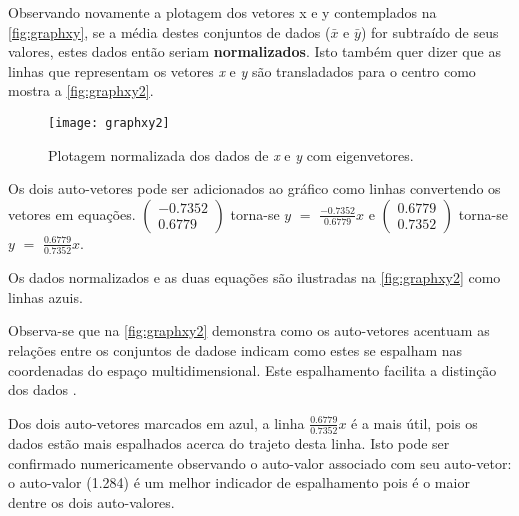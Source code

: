 \begin{comment}
$\begin{pmatrix} 0.6779 \\ 0.7352 \end{pmatrix}$  e 1.284
\end{center}

Ambos os eigenvetores possuem unidade de tamanho.


\subsubsection{Utilizando Eigenfaces como Componente Principal}\label{subsec:eigenacp}
\end{comment}


Observando novamente a plotagem dos vetores x e y contemplados na \autoref{fig:graphxy}, se a média destes conjuntos de dados ($\bar{x}$ e $\bar{y}$) for subtraído de seus valores, estes dados então seriam \textbf{normalizados}. Isto também quer dizer que as linhas que representam os vetores \textit{x} e \textit{y} são transladados para o centro como mostra a \autoref{fig:graphxy2}. 

\begin{figure}[h]
	\centering
	\texttt{[image: graphxy2]}
	\caption{Plotagem normalizada dos dados de \textit{x} e \textit{y} com eigenvetores.}
	\label{fig:graphxy2}
\end{figure}

Os dois auto-vetores pode ser adicionados ao gráfico como linhas convertendo os vetores em equações. 
$\begin{pmatrix} -0.7352 \\ 0.6779 \end{pmatrix}$ torna-se $y$ $=$ $\frac{-0.7352}{0.6779}$$x$  e $\begin{pmatrix} 0.6779 \\ 0.7352 \end{pmatrix}$ torna-se $y$ $=$ $\frac{0.6779}{0.7352}$$x$.

Os dados normalizados e as duas equações são ilustradas na \autoref{fig:graphxy2} como linhas azuis. 

Observa-se que na \autoref{fig:graphxy2} demonstra como os auto-vetores acentuam as relações entre os conjuntos de dadose indicam como estes se espalham nas coordenadas do espaço multidimensional. Este espalhamento facilita a distinção dos dados \cite{drmathew_java_programming}.

Dos dois auto-vetores marcados em azul, a linha $\frac{0.6779}{0.7352}$$x$ é a mais útil, pois os dados estão mais espalhados acerca do trajeto desta linha. Isto pode ser confirmado numericamente observando o auto-valor associado com seu auto-vetor: o auto-valor (1.284) é um melhor indicador de espalhamento pois é o maior dentre os dois auto-valores.

